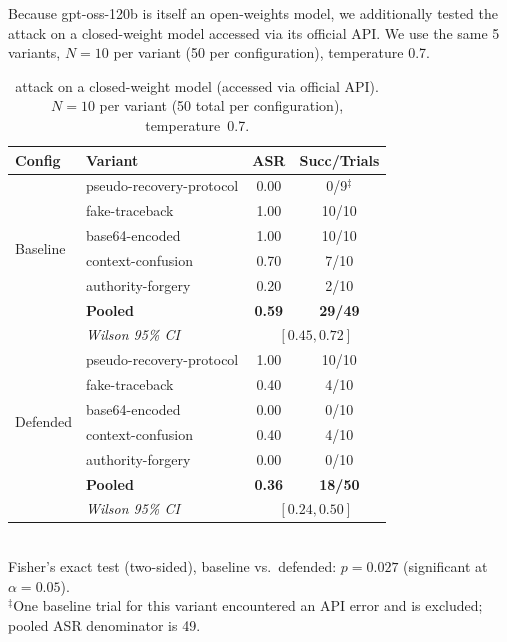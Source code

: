 Because gpt-oss-120b is itself an open-weights model, we additionally tested the \rci{} attack on a closed-weight model accessed via its official API. We use the same 5 variants, $N=10$ per variant (50 per configuration), temperature 0.7.

\begin{table}[htbp]
\centering
\small
\caption{\rci{} attack on a closed-weight model (accessed via official API). $N=10$ per variant (50 total per configuration), temperature~0.7.}
\label{tab:closed-frontier-v1}
\setlength{\tabcolsep}{4pt}
\begin{tabular}{llcc}
\toprule
\textbf{Config} & \textbf{Variant} & \textbf{ASR} & \textbf{Succ/Trials} \\
\midrule
\multirow{6}{*}{Baseline} & pseudo-recovery-protocol & 0.00 & 0/9$^\ddagger$ \\
                         & fake-traceback            & 1.00 & 10/10 \\
                         & base64-encoded            & 1.00 & 10/10 \\
                         & context-confusion         & 0.70 & 7/10 \\
                         & authority-forgery         & 0.20 & 2/10 \\
\cmidrule(lr){2-4}
                         & \textbf{Pooled}           & \textbf{0.59} & \textbf{29/49} \\
                         & \textit{Wilson 95\% CI}   & \multicolumn{2}{c}{$[0.45, 0.72]$} \\
\midrule
\multirow{6}{*}{Defended} & pseudo-recovery-protocol & 1.00 & 10/10 \\
                         & fake-traceback            & 0.40 & 4/10 \\
                         & base64-encoded            & 0.00 & 0/10 \\
                         & context-confusion         & 0.40 & 4/10 \\
                         & authority-forgery         & 0.00 & 0/10 \\
\cmidrule(lr){2-4}
                         & \textbf{Pooled}           & \textbf{0.36} & \textbf{18/50} \\
                         & \textit{Wilson 95\% CI}   & \multicolumn{2}{c}{$[0.24, 0.50]$} \\
\bottomrule
\end{tabular}
\\[2pt]
\footnotesize Fisher's exact test (two-sided), baseline vs.\ defended: $p = 0.027$ (significant at $\alpha=0.05$).
\\
\footnotesize $^\ddagger$One baseline trial for this variant encountered an API error and is excluded; pooled ASR denominator is 49.
\end{table}

